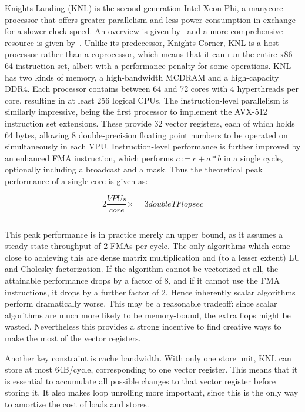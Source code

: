 Knights Landing (KNL) is the second-generation Intel Xeon Phi, a manycore processor that offers greater parallelism and less power consumption in exchange for a slower clock speed. An overview is given by~\cite{Sodani:2016:KLS:2927511.2927563} and a more comprehensive resource is given by~\cite{Jeffers:2016:IXP:3050856}. Unlike its predecessor, Knights Corner, KNL is a host processor rather than a coprocessor, which means that it can run the entire x86-64 instruction set, albeit with a performance penalty for some operations. KNL has two kinds of memory, a high-bandwidth MCDRAM and a high-capacity DDR4. Each processor contains between 64 and 72 cores with 4 hyperthreads per core, resulting in at least 256 logical CPUs. The instruction-level parallelism is similarly impressive, being the first processor to implement the AVX-512 instruction set extensions. These provide 32 vector registers, each of which holds 64 bytes, allowing 8 double-precision floating point numbers to be operated on simultaneously in each \gls{VPU}. Instruction-level performance is further improved by an enhanced \gls{FMA} instruction, which performs $c := c + a*b$ in a single cycle, optionally including a broadcast and a mask. Thus the theoretical peak performance of a single core is given as:

\begin{equation}
  2 \frac{VPUs}{core} \times  = 3 {double TFlop}{sec}
  \label{eq:knl_peak_perf}
\end{equation}

\[\]

This peak performance is in practice merely an upper bound, as it assumes a steady-state throughput of 2 FMAs per cycle. The only algorithms which come close to achieving this are dense matrix multiplication and (to a lesser extent) LU and Cholesky factorization. If the algorithm cannot be vectorized at all, the attainable performance drops by a factor of 8, and if it cannot use the FMA instructions, it drops by a further factor of 2. Hence inherently scalar algorithms perform dramatically worse. This may be a reasonable tradeoff: since scalar algorithms are much more likely to be memory-bound, the extra flops might be wasted. Nevertheless this provides a strong incentive to find creative ways to make the most of the vector registers. 

Another key constraint is cache bandwidth. With only one store unit, KNL can store at most 64B/cycle, corresponding to one vector register. This means that it is essential to accumulate all possible changes to that vector register before storing it. It also makes loop unrolling more important, since this is the only way to amortize the cost of loads and stores.

